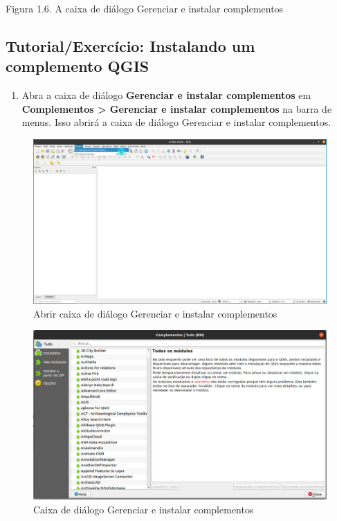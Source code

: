 \documentclass[
]{krantz}
\providecommand{\tightlist}{%
  \setlength{\itemsep}{0pt}\setlength{\parskip}{0pt}}
\begin{document}
Figura 1.6. A caixa de diálogo Gerenciar e instalar complementos

\hypertarget{tutorialexercuxedcio-instalando-um-complemento-qgis}{%
\subsection{Tutorial/Exercício: Instalando um complemento QGIS}\label{tutorialexercuxedcio-instalando-um-complemento-qgis}}

\begin{enumerate}
\def\labelenumi{\arabic{enumi}.}
\tightlist
\item
  Abra a caixa de diálogo \textbf{Gerenciar e instalar complementos} em \textbf{Complementos \textgreater{} Gerenciar e instalar complementos} na barra de menus. Isso abrirá a caixa de diálogo Gerenciar e instalar complementos.
\end{enumerate}

\begin{figure}
\centering
\includegraphics{media/modulo1/plugins-menu-2.png}
\caption{Abrir caixa de diálogo Gerenciar e instalar complementos}
\end{figure}

\begin{figure}
\centering
\includegraphics{media/modulo1/manage-and-install-plugins-dialog.png}
\caption{Caixa de diálogo Gerenciar e instalar complementos}
\end{figure}
\end{document}
